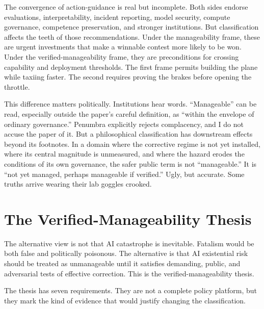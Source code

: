 \documentclass[11pt]{article}
\begin{document}
The convergence of action-guidance is real but incomplete. Both sides endorse evaluations, interpretability, incident reporting, model security, compute governance, competence preservation, and stronger institutions. But classification affects the teeth of those recommendations. Under the manageability frame, these are urgent investments that make a winnable contest more likely to be won. Under the verified-manageability frame, they are preconditions for crossing capability and deployment thresholds. The first frame permits building the plane while taxiing faster. The second requires proving the brakes before opening the throttle.

This difference matters politically. Institutions hear words. ``Manageable'' can be read, especially outside the paper's careful definition, as ``within the envelope of ordinary governance.'' Penumbra explicitly rejects complacency, and I do not accuse the paper of it. But a philosophical classification has downstream effects beyond its footnotes. In a domain where the corrective regime is not yet installed, where its central magnitude is unmeasured, and where the hazard erodes the conditions of its own governance, the safer public term is not ``manageable.'' It is ``not yet managed, perhaps manageable if verified.'' Ugly, but accurate. Some truths arrive wearing their lab goggles crooked.

\section{The Verified-Manageability Thesis}
\label{sec:verified}

The alternative view is not that AI catastrophe is inevitable. Fatalism would be both false and politically poisonous. The alternative is that AI existential risk should be treated as unmanageable until it satisfies demanding, public, and adversarial tests of effective correction. This is the verified-manageability thesis.

The thesis has seven requirements. They are not a complete policy platform, but they mark the kind of evidence that would justify changing the classification.
\end{document}
